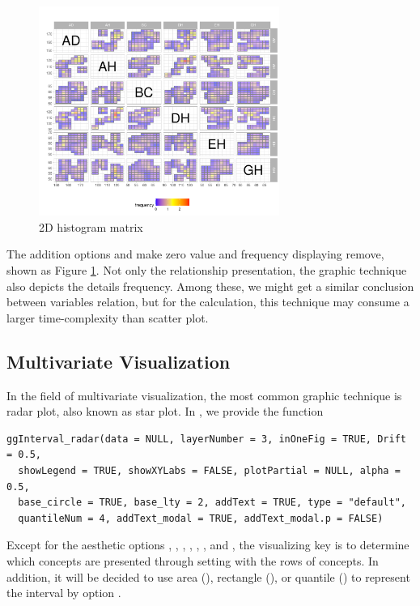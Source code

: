\documentclass[article]{jss}
\begin{document}
\begin{figure}[htbp]
\centering
\includegraphics[trim=0cm 0.4cm 0cm 1.5cm,width=0.7\textwidth,clip]{ggESDA_Jiang&Wu_20210915-2DhistMatrix.pdf
}
\caption{\label{fig:2DhistMatrix} 2D histogram matrix}
\end{figure}


The addition options  and  make zero value and frequency displaying remove, shown as Figure \ref{fig:2DhistMatrix}. Not only the relationship presentation, the graphic technique also depicts the details frequency. Among these, we might get a similar conclusion between variables relation, but for the calculation, this technique may consume a larger time-complexity than scatter plot.



\subsection{Multivariate Visualization}

In the field of multivariate visualization, the most common graphic technique is radar plot, also known as star plot. In , we provide the function

\begin{verbatim}
ggInterval_radar(data = NULL, layerNumber = 3, inOneFig = TRUE, Drift = 0.5, 
  showLegend = TRUE, showXYLabs = FALSE, plotPartial = NULL, alpha = 0.5, 
  base_circle = TRUE, base_lty = 2, addText = TRUE, type = "default",
  quantileNum = 4, addText_modal = TRUE, addText_modal.p = FALSE)
\end{verbatim}

Except for the aesthetic options , , , , , , and , the visualizing key is to determine which concepts are presented through setting  with the rows of concepts. In addition, it will be decided to use area (), rectangle (), or quantile () to represent the interval by option .
\end{document}
